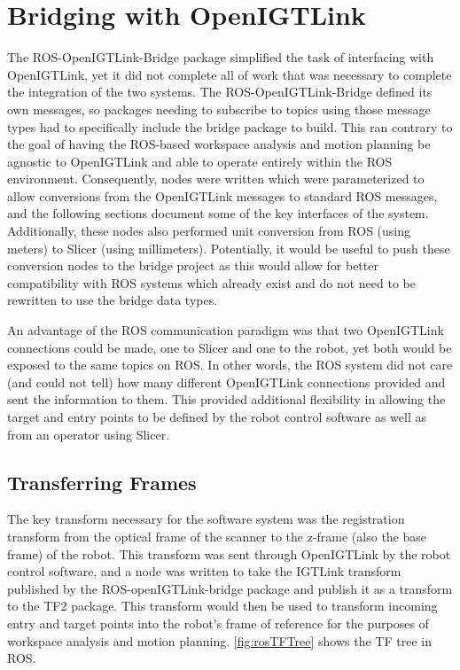 \documentclass[12pt]{report}
\begin{document}
\section{Bridging with OpenIGTLink}
The ROS-OpenIGTLink-Bridge package simplified the task of interfacing with OpenIGTLink, yet it did not complete all of work that was necessary to complete the integration of the two systems. The ROS-OpenIGTLink-Bridge defined its own messages, so packages needing to subscribe to topics using those message types had to specifically include the bridge package to build. This ran contrary to the goal of having the ROS-based workspace analysis and motion planning be agnostic to OpenIGTLink and able to operate entirely within the ROS environment. Consequently, nodes were written which were parameterized to allow conversions from the OpenIGTLink messages to standard ROS messages, and the following sections document some of the key interfaces of the system. Additionally, these nodes also performed unit conversion from ROS (using meters) to Slicer (using millimeters). Potentially, it would be useful to push these conversion nodes to the bridge project as this would allow for better compatibility with ROS systems which already exist and do not need to be rewritten to use the bridge data types.

An advantage of the ROS communication paradigm was that two OpenIGTLink connections could be made, one to Slicer and one to the robot, yet both would be exposed to the same topics on ROS. In other words, the ROS system did not care (and could not tell) how many different OpenIGTLink connections provided and sent the information to them. This provided additional flexibility in allowing the target and entry points to be defined by the robot control software as well as from an operator using Slicer.

\subsection{Transferring Frames}
The key transform necessary for the software system was the registration transform from the optical frame of the scanner to the z-frame (also the base frame) of the robot. This transform was sent through OpenIGTLink by the robot control software, and a node was written to take the IGTLink transform published by the ROS-openIGTLink-bridge package and publish it as a transform to the TF2 package. This transform would then be used to transform incoming entry and target points into the robot's frame of reference for the purposes of workspace analysis and motion planning. \autoref{fig:rosTFTree} shows the TF tree in ROS.
\end{document}
